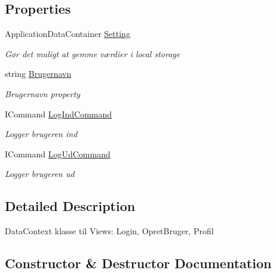 \subsection*{Properties}
\begin{DoxyCompactItemize}
\item 
Application\+Data\+Container \hyperlink{class__1aarsproeve_1_1_view_model_1_1_bruger_view_model_ac9e91065596a741027a1b88853bd76e6}{Setting}
\begin{DoxyCompactList}\small\item\em Gør det muligt at gemme værdier i local storage \end{DoxyCompactList}\item 
string \hyperlink{class__1aarsproeve_1_1_view_model_1_1_bruger_view_model_a63b4a8aa59a8e3e2ec0d7285c2ce6caa}{Brugernavn}
\begin{DoxyCompactList}\small\item\em Brugernavn property \end{DoxyCompactList}\item 
I\+Command \hyperlink{class__1aarsproeve_1_1_view_model_1_1_bruger_view_model_a40fed761861b9387bc47a92a2f1e55fd}{Log\+Ind\+Command}
\begin{DoxyCompactList}\small\item\em Logger brugeren ind \end{DoxyCompactList}\item 
I\+Command \hyperlink{class__1aarsproeve_1_1_view_model_1_1_bruger_view_model_afc1d332a62edcc717d3e1764db42c89a}{Log\+Ud\+Command}
\begin{DoxyCompactList}\small\item\em Logger brugeren ud \end{DoxyCompactList}\end{DoxyCompactItemize}


\subsection{Detailed Description}
Data\+Context klasse til Views\+: Login, Opret\+Bruger, Profil 



\subsection{Constructor \& Destructor Documentation}
\hypertarget{class__1aarsproeve_1_1_view_model_1_1_bruger_view_model_a2852c87e53378bf746f319770e026be5}{}
